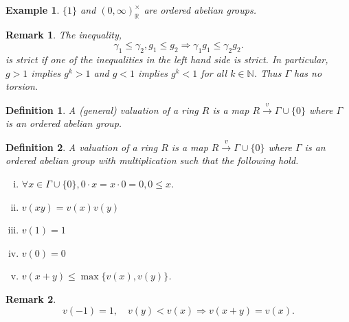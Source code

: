 \documentclass[8pt]{article}
\numberwithin{equation}{section}
\newtheorem{definition}{Definition}[subsection]
\newtheorem{remark}{Remark}[subsection]
\newtheorem{example}{Example}[subsection]
\newcommand{\N}[0]{\mathbb{N}}
\newcommand{\R}[0]{\mathbb{R}}
\begin{document}
\begin{example}
    $\{1\}$ and $(0,\infty)_\R^\times$ are ordered abelian groups. 
\end{example}

\begin{remark}
    The inequality,
    \begin{equation*}
        \gamma_1\leq \gamma_2, g_1\leq g_2\Rightarrow \gamma_1g_1\leq \gamma_2g_2.
    \end{equation*}
    is strict if one of the inequalities in the left hand side is strict.
    In particular, $g>1$ implies $g^k>1$ and $g<1$ implies $g^k<1$ for all $k\in\N$. Thus $\Gamma$ has no torsion.
\end{remark}

\begin{definition}
    \label{definition_1_valuation_rings}
    A (general) valuation of a ring $R$ is a map $R\stackrel{v}{\to}\Gamma\cup\{0\}$ where $\Gamma$ is an ordered abelian group.
\end{definition}

\begin{definition}
    \label{definition_5_2}
    A valuation of a ring $R$ is a map $R\stackrel{v}{\to}\Gamma\cup\{0\}$ where $\Gamma$ is an ordered abelian group with multiplication such that the following hold.
    \begin{enumerate}[i.]
        \item $\forall x\in\Gamma\cup\{0\}, 0\cdot x = x\cdot 0 = 0, 0\leq x$.
        \item $v(xy) = v(x)v(y)$
        \item $v(1) = 1$
        \item $v(0) = 0$
        \item $v(x+y)\leq \max\{v(x),v(y)\}$. 
    \end{enumerate}
\end{definition}

\begin{remark}
    \begin{equation*}
        v(-1) = 1,\quad v(y)<v(x)\Rightarrow v(x+y) = v(x).
    \end{equation*}
\end{remark}
\end{document}
